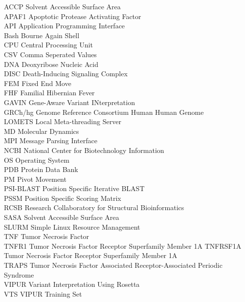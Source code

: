 ACCP Solvent Accessible Surface Area\\
APAF1 Apoptotic Protease Activating Factor\\
API Application Programming Interface\\
Bash Bourne Again Shell\\
CPU Central Processing Unit\\
CSV Comma Seperated Values\\
DNA Deoxyribose Nucleic Acid\\
DISC Death-Inducing Signaling Complex\\
FEM Fixed End Move\\
FHF Familial Hibernian Fever\\
GAVIN Gene-Aware Variant INterpretation\\
GRCh/hg Genome Reference Consortium Human Human Genome\\
LOMETS Local Meta-threading Server\\
MD	Molecular Dynamics\\
MPI Message Parsing Interface\\
NCBI National Center for Biotechnology Information\\
OS Operating System\\
PDB Protein Data Bank\\
PM Pivot Movement\\
PSI-BLAST Position Specific Iterative BLAST\\
PSSM Position Specific Scoring Matrix\\
RCSB Research Collaboratory for Structural Bioinformatics\\
SASA Solvent Accessible Surface Area\\
SLURM Simple Linux Resource Management\\
TNF Tumor Necrosis Factor\\
TNFR1 Tumor Necrosis Factor Receptor Superfamily Member 1A
TNFRSF1A Tumor Necrosis Factor Receptor Superfamily Member 1A\\
TRAPS Tumor Necrosis Factor Associated Receptor-Associated Periodic Syndrome\\
VIPUR Variant Interpretation Using Rosetta\\
VTS VIPUR Training Set\\